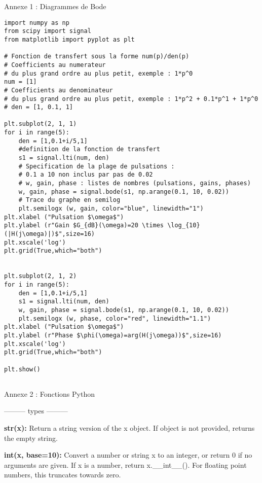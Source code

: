 \pagebreak
\begin{center}
\huge{Annexe 1 : Diagrammes de Bode}
\end{center}
%
\begin{lstlisting}
import numpy as np
from scipy import signal
from matplotlib import pyplot as plt

# Fonction de transfert sous la forme num(p)/den(p)
# Coefficients au numerateur
# du plus grand ordre au plus petit, exemple : 1*p^0
num = [1]
# Coefficients au denominateur
# du plus grand ordre au plus petit, exemple : 1*p^2 + 0.1*p^1 + 1*p^0
# den = [1, 0.1, 1]
 
plt.subplot(2, 1, 1)
for i in range(5):
    den = [1,0.1+i/5,1]
    #definition de la fonction de transfert
    s1 = signal.lti(num, den) 
    # Specification de la plage de pulsations :
    # 0.1 a 10 non inclus par pas de 0.02
    # w, gain, phase : listes de nombres (pulsations, gains, phases)
    w, gain, phase = signal.bode(s1, np.arange(0.1, 10, 0.02))
    # Trace du graphe en semilog
    plt.semilogx (w, gain, color="blue", linewidth="1")
plt.xlabel ("Pulsation $\omega$")
plt.ylabel (r"Gain $G_{dB}(\omega)=20 \times \log_{10}(|H(j\omega)|)$",size=16)
plt.xscale('log')
plt.grid(True,which="both")

 
plt.subplot(2, 1, 2)
for i in range(5):
    den = [1,0.1+i/5,1]
    s1 = signal.lti(num, den)
    w, gain, phase = signal.bode(s1, np.arange(0.1, 10, 0.02))
    plt.semilogx (w, phase, color="red", linewidth="1.1")
plt.xlabel ("Pulsation $\omega$")
plt.ylabel (r"Phase $\phi(\omega)=arg(H(j\omega))$",size=16)
plt.xscale('log')
plt.grid(True,which="both")

plt.show()


\end{lstlisting}
\vfill

\pagebreak
\begin{center}
\huge{Annexe 2 : Fonctions Python}
\end{center}

\begin{center}
--------- types ---------
\end{center}


\textsf{\textbf{str(x):}} Return a string version of the x object. If object is not provided, returns the empty string.

\vspace{.5cm}

\textsf{\textbf{int(x, base=10):}} Convert a number or string x to an integer, or return 0 if no arguments are given. If x is a number, return x.\_\_int\_\_(). For floating point numbers, this truncates towards zero.

